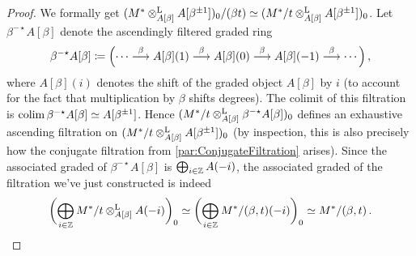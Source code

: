 \documentclass[DIV=12,numbers=enddot,leqno,bibliography=totoc]{scrartcl}
\begin{document}
	\begin{proof}
		We formally get $(M^*\otimes^{\mathrm{L}}_{A[\beta]}A[\beta^{\pm 1}])_0/(\beta t)\simeq (M^*/t\otimes^{\mathrm{L}}_{A[\beta]}A[\beta^{\pm 1}])_0$. Let $\beta^{-\star}A[\beta]$ denote the ascendingly filtered graded ring
		\begin{equation*}
			\beta^{-\star}A[\beta]\coloneqq \Bigl(\dotsb\overset{\beta}{\longrightarrow}A[\beta](1)\overset{\beta}{\longrightarrow}A[\beta](0)\overset{\beta}{\longrightarrow}A[\beta](-1)\overset{\beta}{\longrightarrow}\dotsb\Bigr)\,,
		\end{equation*}
		where $A[\beta](i)$ denotes the shift of the graded object $A[\beta]$ by $i$ (to account for the fact that multiplication by $\beta$ shifts degrees). The colimit of this filtration is $\operatorname*{colim} \beta^{-\star}A[\beta]\simeq A[\beta^{\pm 1}]$. Hence $(M^*/t\otimes^{\mathrm{L}}_{A[\beta]}\beta^{-\star}A[\beta])_0$ defines an exhaustive ascending filtration on $(M^*/t\otimes^{\mathrm{L}}_{A[\beta]}A[\beta^{\pm 1}])_0$ (by inspection, this is also precisely how  the conjugate filtration from \cref{par:ConjugateFiltration} arises). Since the associated graded of $\beta^{-\star}A[\beta]$ is $\bigoplus_{i\in\mathbb{Z}}A(-i)$, the associated graded of the filtration we've just constructed is indeed
		\begin{equation*}
			\biggl(\bigoplus_{i\in\mathbb{Z}}M^*/t\otimes^{\mathrm{L}}_{A[\beta]}A(-i)\biggr)_0\simeq \biggl(\bigoplus_{i\in\mathbb{Z}}M^*/(\beta,t)(-i)\biggr)_0\simeq M^*/(\beta,t)\,.\qedhere
		\end{equation*}
	\end{proof}
	
\end{document}
